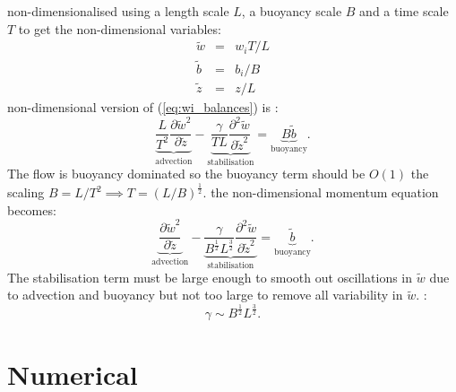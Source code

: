 \documentclass[draft]{agujournal2019}
\begin{document}
 non-dimensionalised using a length scale $L$, a buoyancy scale
$B$ and a time scale $T$ to get the non-dimensional variables:
\begin{eqnarray*}
\tilde{w} & = & w_{i}T/L\\
\tilde{b} & = & b_{i}/B\\
\tilde{z} & = & z/L
\end{eqnarray*}
 non-dimensional version of (\ref{eq:wi_balances}) is :
\begin{equation}
\underbrace{{\frac{L}{T^{2}}\frac{\partial\tilde{w}^{2}}{\partial\tilde{z}}}}_{\text{advection}}-\underbrace{{\frac{\gamma}{TL}\frac{\partial^{2}\tilde{w}}{\partial\tilde{z}^{2}}}}_{\text{stabilisation}}=\underbrace{B\tilde{b}}_{\text{buoyancy}}.\label{eq:wi_nonDomTmp}
\end{equation}
The flow is buoyancy dominated so the buoyancy term should be $O(1)$
 the scaling $B=L/T^{2}\implies T=(L/B)^{\frac{1}{2}}$.  the non-dimensional momentum equation becomes:
\begin{equation}
\underbrace{{\frac{\partial\tilde{w}^{2}}{\partial\tilde{z}}}}_{\text{advection}}-\underbrace{{\frac{\gamma}{B^{\frac{1}{2}}L^{\frac{3}{2}}}\frac{\partial^{2}\tilde{w}}{\partial\tilde{z}^{2}}}}_{\text{stabilisation}}=\underbrace{\tilde{b}}_{\text{buoyancy}}.\label{eq:wi_nonDom-1}
\end{equation}
The stabilisation term must be large enough to smooth out oscillations
in $\tilde{w}$ due to advection and buoyancy but not too large to
remove all variability in $\tilde{w}$. :
\begin{equation}
\gamma\sim B^{\frac{1}{2}}L^{\frac{3}{2}}.\label{eq:gammaDimAnal}
\end{equation}


\section{\label{sec:numerics}Numerical }
\end{document}
